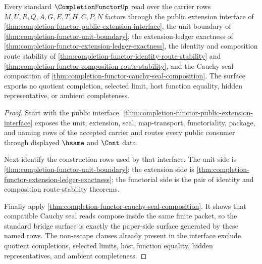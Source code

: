 \begin{theorem}
\label{thm:completion-functor-standard-bridge-surface}
Every standard $\CompletionFunctorUp$ read over the carrier rows $M,U,R,Q,A,G,E,T,H,C,P,N$ factors through the public extension interface of \autoref{thm:completion-functor-public-extension-interface}, the unit boundary of \autoref{thm:completion-functor-unit-boundary}, the extension-ledger exactness of \autoref{thm:completion-functor-extension-ledger-exactness}, the identity and composition route stability of \autoref{thm:completion-functor-identity-route-stability} and \autoref{thm:completion-functor-composition-route-stability}, and the Cauchy seal composition of \autoref{thm:completion-functor-cauchy-seal-composition}. The surface exports no quotient completion, selected limit, host function equality, hidden representative, or ambient completeness.
\end{theorem}
\begin{proof}
Start with the public interface. \autoref{thm:completion-functor-public-extension-interface} exposes the unit, extension, seal, map-transport, functoriality, package, and naming rows of the accepted carrier and routes every public consumer through displayed $\hsame$ and $\Cont$ data.

Next identify the construction rows used by that interface. The unit side is \autoref{thm:completion-functor-unit-boundary}; the extension side is \autoref{thm:completion-functor-extension-ledger-exactness}; the functorial side is the pair of identity and composition route-stability theorems.

Finally apply \autoref{thm:completion-functor-cauchy-seal-composition}. It shows that compatible Cauchy seal reads compose inside the same finite packet, so the standard bridge surface is exactly the paper-side surface generated by these named rows. The non-escape clauses already present in the interface exclude quotient completions, selected limits, host function equality, hidden representatives, and ambient completeness.
\end{proof}


